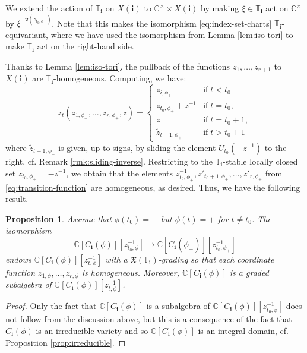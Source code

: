 \documentclass[a4paper, 11pt]{amsart}
\newcommand{\charlat}{\mathfrak{X}}
\newcommand{\word}[1]{\mathbf{#1}}
\newcommand{\C}{\mathbb{C}}
\newcommand{\wt}{\mathtt{w}}
\newcommand{\dil}[1]{\mathbb{T}_{#1}}
\newtheorem{proposition}[theorem]{Proposition}%
\theoremstyle{definition}
\begin{document}
We extend the action of $\dil{\word{i}}$ on $X(\word{i})$ to $\C^{\times} \times X(\word{i})$ by making $\xi \in \dil{\word{i}}$ act on $\C^{\times}$ by $\xi^{-\wt(z_{t_0, \phi_{+}})}$. Note that this makes the isomorphism \eqref{eq:index-set-charts} $\dil{\word{i}}$-equivariant, where we have used the isomorphism from Lemma \ref{lem:iso-tori} to make $\dil{\word{i}}$ act on the right-hand side. 

Thanks to Lemma \ref{lem:iso-tori}, the pullback of the functions $z_1, \dots, z_{r+1}$ to $X(\word{i})$ are $\dil{\word{i}}$-homogeneous. Computing, we have:
\[
z_t(z_{1, \phi_{+}}, \dots, z_{r, \phi_{+}}, z) = \begin{cases} z_{i, \phi_{+}} & \text{if} \; t < t_0 \\
z_{t_0, \phi_{+}} + z^{-1} & \text{if} \; t = t_0, \\ 
z & \text{if} \; t = t_0+1, \\
\widetilde{z}_{t-1, \phi_{+}} & \text{if} \; t > t_0+1\end{cases} 
\]
where $\widetilde{z}_{t-1, \phi_{+}}$ is given, up to signs, by sliding the element $U_{t_0}(-z^{-1})$ to the right, cf. Remark \ref{rmk:sliding-inverse}. Restricting to the $\dil{\word{i}}$-stable locally closed set $z_{t_0, \phi_{+}} = -z^{-1}$, we obtain that the elements $z_{t_0, \phi_{+}}^{-1}, z'_{t_0+1, \phi_{+}}, \dots, z'_{r, \phi_{+}}$ from \eqref{eq:transition-function} are homogeneous, as desired. Thus, we have the following result.

\begin{proposition}\label{prop:grading-one-minus}
    Assume that $\phi(t_0) = -$ but $\phi(t) = +$ for $t \neq t_0$. The isomorphism
    \[
    \C[C_{\word{i}}(\phi)][z_{t_0, \phi}^{-1}] \to \C[C_{\word{i}}(\phi_{+})][z_{t_0, \phi_{+}}^{-1}]
    \]
    endows $\C[C_{\word{i}}(\phi)][z_{t, \phi}^{-1}]$ with a $\charlat(\dil{\word{i}})$-grading so that each coordinate function $z_{1, \phi}, \dots, z_{r, \phi}$ is homogeneous. Moreover, $\C[C_{\word{i}}(\phi)]$ is a graded subalgebra of $\C[C_{\word{i}}(\phi)][z_{t, \phi}^{-1}]$.
\end{proposition}
\begin{proof}
    Only the fact that $\C[C_{\word{i}}(\phi)]$ is a subalgebra of $\C[C_{\word{i}}(\phi)][z_{t_0, \phi}^{-1}]$ does not follow from the discussion above, but this is a consequence of the fact that $C_{\word{i}}(\phi)$ is an irreducible variety and so $\C[C_{\word{i}}(\phi)]$ is an integral domain, cf. Proposition \ref{prop:irreducible}.
\end{proof}
\end{document}
